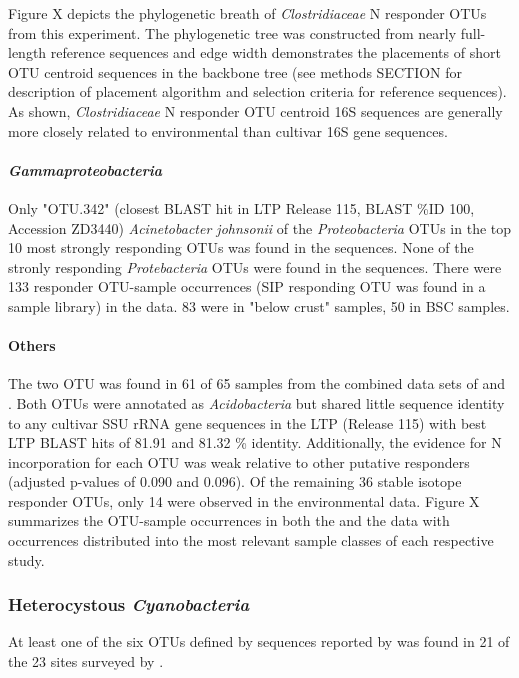 Figure X depicts the phylogenetic breath of \textit{Clostridiaceae} N responder OTUs from this experiment. The phylogenetic tree was constructed from nearly full-length reference sequences and edge width demonstrates the placements of short OTU centroid sequences in the backbone tree (see methods SECTION for description of placement algorithm and selection criteria for reference sequences). As shown, \textit{Clostridiaceae} N responder OTU centroid 16S sequences are generally more closely related to environmental than cultivar 16S gene sequences.   

\paragraph{\textit{Gammaproteobacteria}}
Only "OTU.342" (closest BLAST hit in LTP Release 115, BLAST \%ID 100, Accession ZD3440) \textit{Acinetobacter johnsonii} of the \textit{Proteobacteria} OTUs in the top 10 most strongly responding OTUs was found in the \citet{Garcia_Pichel_2013} sequences. None of the stronly responding \textit{Protebacteria} OTUs were found in the \citet{Steven_2013} sequences. There were 133 responder OTU-sample occurrences (SIP responding OTU was found in a sample library) in the \citet{Steven_2013} data. 83 were in "below crust" samples, 50 in BSC samples.
\paragraph{Others} 
The two OTU was found in 61 of 65 samples from the combined data sets of \citet{Garcia_Pichel_2013} and \citet{Steven_2013}. Both OTUs were annotated as \textit{Acidobacteria} but shared little sequence identity to any cultivar SSU rRNA gene sequences in the LTP (Release 115) with best LTP BLAST hits of 81.91 and 81.32 \% identity. Additionally, the evidence for N incorporation for each OTU was weak relative to other putative responders (adjusted p-values of 0.090 and 0.096). Of the remaining 36 stable isotope responder OTUs, only 14 were observed in the environmental data. Figure X summarizes the OTU-sample occurrences in both the \citet{Steven_2013} and the \citet{Garcia_Pichel_2013} data with occurrences distributed into the most relevant sample classes of each respective study.

\subsubsection{Heterocystous \textit{Cyanobacteria}}
At least one of the six OTUs defined by sequences reported by \citet{Yeager} was found in 21 of the 23 sites surveyed by \citet{Garcia_Pichel_2013}. 
